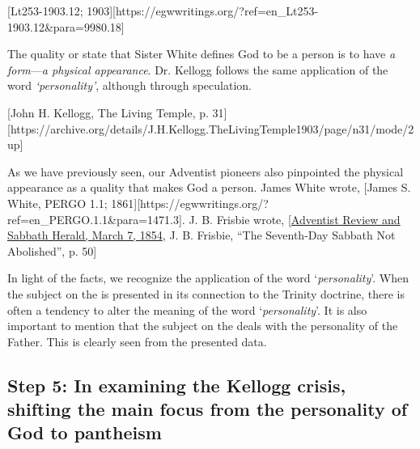 [Lt253-1903.12; 1903][https://egwwritings.org/?ref=en\_Lt253-1903.12&para=9980.18]

The quality or state that Sister White defines God to be a person is to have \textit{a form}—\textit{a physical appearance}. Dr. Kellogg follows the same application of the word \textit{‘personality’}, although through speculation.

[John H. Kellogg, The Living Temple, p. 31][https://archive.org/details/J.H.Kellogg.TheLivingTemple1903/page/n31/mode/2up]

As we have previously seen, our Adventist pioneers also pinpointed the physical appearance as a quality that makes God a person. James White wrote, [James S. White, PERGO 1.1; 1861][https://egwwritings.org/?ref=en\_PERGO.1.1&para=1471.3]. J. B. Frisbie wrote, [\href{https://documents.adventistarchives.org/Periodicals/RH/RH18540307-V05-07.pdf}{Adventist Review and Sabbath Herald, March 7, 1854}, J. B. Frisbie, “The Seventh-Day Sabbath Not Abolished”, p. 50]

In light of the facts, we recognize the application of the word ‘\textit{personality}’. When the subject on the  is presented in its connection to the Trinity doctrine, there is often a tendency to alter the meaning of the word ‘\textit{personality}’. It is also important to mention that the subject on the  deals with the personality of the Father. This is clearly seen from the presented data.

\subsection*{Step 5: In examining the Kellogg crisis, shifting the main focus from the personality of God to pantheism}

